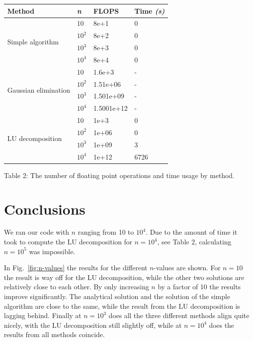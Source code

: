 \documentclass{article}
\begin{document}
\begin{multicols}{2}
\begin{center}
    \begin{tabular}{ l  l  l  l } \hline
    \textbf{Method} 					&\textbf{\textit{n}} 	&\textbf{FLOPS} 	&\textbf{Time \textit{(s)}} \\ \hline
    \multirow{4}{*}{Simple algorithm} 		& 10 				& 8e+1			& 0 \\ 
    								& $10^2$  		& 8e+2 			& 0 \\
    								& $10^3$ 			& 8e+3 			& 0 \\ 
								& $10^4$ 			& 8e+4 			& 0 \\
    \hline
    \multirow{4}{*}{Gaussian elimination} 	& 10				& 1.6e+3			& - \\ 
    								& $10^2$  		& 1.51e+06		& - \\
    								& $10^3$ 			& 1.501e+09 		& - \\ 
								& $10^4$ 			& 1.5001e+12 		& - \\ 
    \hline
    \multirow{4}{*}{LU decomposition} 		& 10				& 1e+3			& 0 \\ 
    								& $10^2$ 			& 1e+06			& 0 \\
    								& $10^3$ 			& 1e+09			& 3 \\ 
								& $10^4$ 			& 1e+12			& 6726 \\ 
    \hline
    \end{tabular}
\end{center}

\begin{center}
Table 2: The number of floating point operations and time usage by method.
\end{center}


\section{Conclusions} \label{sec:conclusions}
We ran our code with $n$ ranging from 10 to $10^4$. Due to the amount of time it took to compute the LU decomposition for $n = 10^4$, see Table 2, calculating $n = 10^5$ was impossible. 

In Fig.~\ref{fig:n-values} the results for the different $n$-values are shown. For $n = 10$ the result is way off for the LU decomposition, while the other two solutions are relatively close to each other. By only increasing $n$ by a factor of 10 the results improve significantly. The analytical solution and the solution of the simple algorithm are close to the same, while the result from the LU decomposition is lagging behind. Finally at $n = 10^3$ does all the three different methods align quite nicely, with the LU decomposition still slightly off, while at $n = 10^4$ does the results from all methods coincide. 


\end{multicols}
\end{document}
